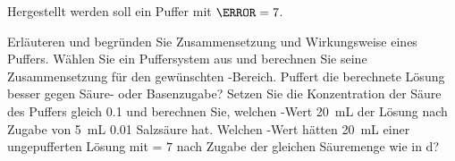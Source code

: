 \documentclass[DIV11]{scrartcl}
\begin{document}
\begin{question}
Hergestellt werden soll ein Puffer mit $\pH = 7$.
\begin{tasks}
  \task Erläuteren und begründen Sie Zusammensetzung und Wirkungsweise eines
    Puffers.
  \task Wählen Sie ein Puffersystem aus und berechnen Sie seine
    Zusammensetzung für den gewünschten \pH-Bereich.
  \task Puffert die berechnete Lösung besser gegen Säure- oder Basenzugabe?
  \task Setzen Sie die Konzentration der Säure des Puffers gleich
    \SI{0.1}{\Molar} und berechnen Sie, welchen \pH-Wert \SI{20}{\milli\liter}
    der Lösung nach Zugabe von \SI{5}{\milli\liter} \SI{0.01}{\Molar}
    Salzsäure hat.
  \task Welchen \pH-Wert hätten \SI{20}{\milli\liter} einer ungepufferten
    Lösung mit \pH = $7$ nach Zugabe der gleichen Säuremenge wie in d?
\end{tasks}
\end{question}
\end{document}
